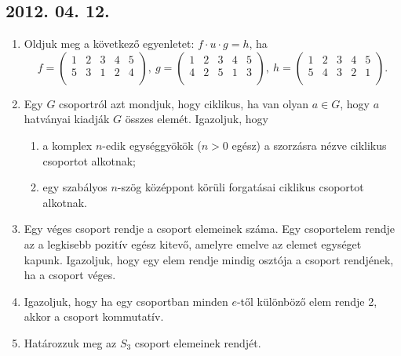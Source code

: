 \documentclass{article}
\newenvironment{abc}{\begin{enumerate}[label=\textit{\alph*})]}{\end{enumerate}}
\begin{document}
\subsection*{2012. 04. 12.}
\begin{enumerate}
\item Oldjuk meg a következő egyenletet: $f\cdot u\cdot g=h$, ha 
\[f=\left(\begin{matrix}
1&2&3&4&5\\
5&3&1&2&4\\
\end{matrix}\right),~
g=\left(\begin{matrix}
1&2&3&4&5\\
4&2&5&1&3\\
\end{matrix}\right),~
h=\left(\begin{matrix}
1&2&3&4&5\\
5&4&3&2&1\\
\end{matrix}\right).\]
\item Egy $G$ csoportról azt mondjuk, hogy ciklikus, ha van olyan $a\in G$, hogy $a$ hatványai kiadják $G$ összes elemét. Igazoljuk, hogy
\begin{abc}
\item a komplex $n$-edik egységgyökök ($n>0$ egész) a szorzásra nézve ciklikus csoportot alkotnak;
\item egy szabályos $n$-szög középpont körüli forgatásai ciklikus csoportot alkotnak.
\end{abc}
\item Egy véges csoport rendje a csoport elemeinek száma. Egy csoportelem rendje az a legkisebb pozitív egész kitevő, amelyre emelve az elemet egységet kapunk. Igazoljuk, hogy egy elem rendje mindig osztója a csoport rendjének, ha a csoport véges.
\item Igazoljuk, hogy ha egy csoportban minden $e$-től különböző elem rendje 2, akkor a csoport kommutatív.
\item Határozzuk meg az $S_3$ csoport elemeinek rendjét.
\end{enumerate}
\end{document}
